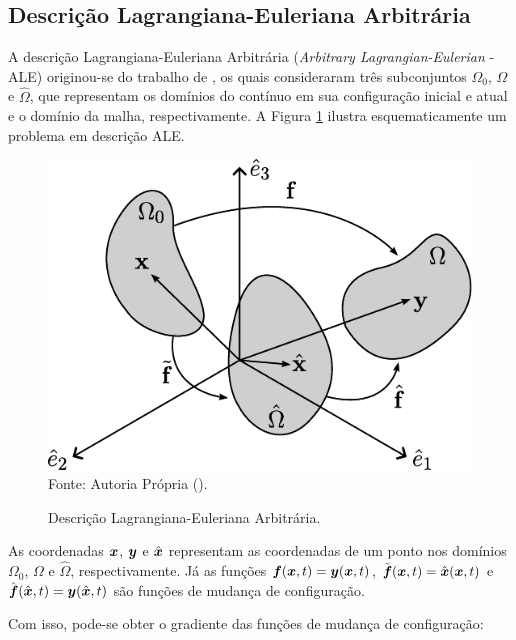 \subsection{Descrição Lagrangiana-Euleriana Arbitrária} \label{CFD-ALE}

A descrição Lagrangiana-Euleriana Arbitrária (\textit{Arbitrary Lagrangian-Eulerian} - ALE) originou-se do trabalho de , os quais consideraram três subconjuntos $\Omega_0$, $\Omega$ e $\hat{\Omega}$, que representam os domínios do contínuo em sua configuração inicial e atual e o domínio da malha, respectivamente. A Figura \ref{Fig:ALE} ilustra esquematicamente um problema em descrição ALE.

\begin{figure}[h!]
    \centering
    \caption{Descrição Lagrangiana-Euleriana Arbitrária.}
    \includegraphics[width=.45\linewidth]{Figuras/ALE.pdf}
    \label{Fig:ALE}
    \\Fonte: Autoria Própria (\the\year).
\end{figure}

As coordenadas $\boldsymbol{x}$, $\boldsymbol{y}$ e $\hat{\boldsymbol{x}}$ representam as coordenadas de um ponto nos domínios $\Omega_0$, $\Omega$ e $\hat{\Omega}$, respectivamente. Já as funções $\boldsymbol{f}(\boldsymbol{x},t)=\boldsymbol{y}(\boldsymbol{x},t)$, $\tilde{\boldsymbol{f}}(\boldsymbol{x},t)=\hat{\boldsymbol{x}}(\boldsymbol{x},t)$ e $\hat{\boldsymbol{f}}(\hat{\boldsymbol{x}},t)=\boldsymbol{y}(\hat{\boldsymbol{x}},t)$ são funções de mudança de configuração.

Com isso, pode-se obter o gradiente das funções de mudança de configuração:

